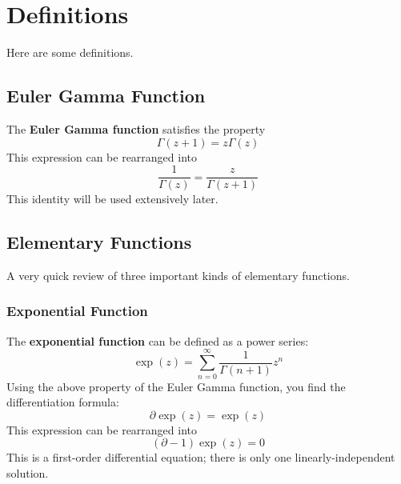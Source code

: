 \chapter{Definitions}
Here are some definitions.
\section{Euler Gamma Function}
The \textbf{Euler Gamma function} satisfies the property
\begin{equation}
	\Gamma(z + 1) = z \Gamma(z)
\end{equation}
This expression can be rearranged into
\begin{equation}
	\frac{1}{\Gamma(z)} = \frac{z}{\Gamma(z + 1)}
\end{equation}
This identity will be used extensively later.
\section{Elementary Functions}
A very quick review of three important kinds of elementary functions.
\subsection{Exponential Function}
The \textbf{exponential function} can be defined as a power series:
\begin{equation}
	\exp(z) = \sum_{n = 0}^{\infty} \frac{1}{\Gamma(n + 1)} z^{n}
\end{equation}
Using the above property of the Euler Gamma function, you find the differentiation formula:
\begin{equation}
	\partial \exp(z) = \exp(z)
\end{equation}
This expression can be rearranged into
\begin{equation}
	\left( \partial - 1 \right) \exp(z) = 0
\end{equation}
This is a first-order differential equation; there is only one linearly-independent solution.

